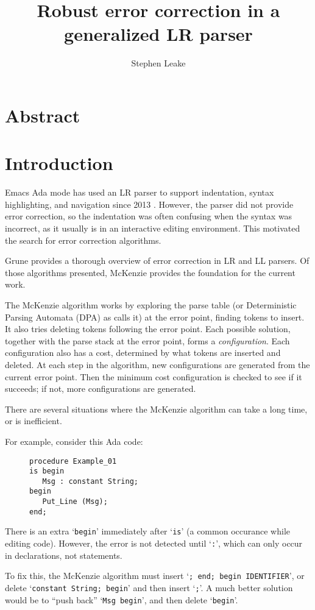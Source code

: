 \documentclass{article}
\title{Robust error correction in a generalized LR parser}
\author{Stephen Leake}
\newcommand{\code}[1]{`{\tt #1}'}
\begin{document}
\section{Abstract}

\section{Introduction}
Emacs Ada mode has used an LR parser to support indentation, syntax
highlighting, and navigation since 2013 \cite{Emacs Ada mode news}.
However, the parser did not provide error correction, so the
indentation was often confusing when the syntax was incorrect, as it
usually is in an interactive editing environment. This motivated the
search for error correction algorithms.

Grune \cite{Grune 2008} provides a thorough overview of error correction in
LR and LL parsers. Of those algorithms presented, McKenzie \cite{McKenzie 1995}
provides the foundation for the current work.

The McKenzie algorithm works by exploring the parse table (or
Deterministic Parsing Automata (DPA) as \cite{McKenzie 1995} calls it)
at the error point, finding tokens to insert. It also tries deleting
tokens following the error point. Each possible solution, together
with the parse stack at the error point, forms a
\textit{configuration}. Each configuration also has a cost, determined
by what tokens are inserted and deleted. At each step in the
algorithm, new configurations are generated from the current error
point. Then the minimum cost configuration is checked to see if it
succeeds; if not, more configurations are generated.

There are several situations where the McKenzie algorithm can take a
long time, or is inefficient.

For example, consider this Ada code:
\begin{figure}[H]
\begin{verbatim}
procedure Example_01
is begin
   Msg : constant String;
begin
   Put_Line (Msg);
end;
\end{verbatim}
\caption{}
\label{ex:extra_begin_1}
\end{figure}

There is an extra \code{begin} immediately after \code{is} (a common
occurance while editing code). However, the error is not detected
until \code{:}, which can only occur in declarations, not statements.

To fix this, the McKenzie algorithm must insert \code{; end; begin
  IDENTIFIER}, or delete \code{constant String; begin} and then insert
\code{;}. A much better solution would be to ``push back'' \code{Msg
  begin}, and then delete \code{begin}.
\end{document}
